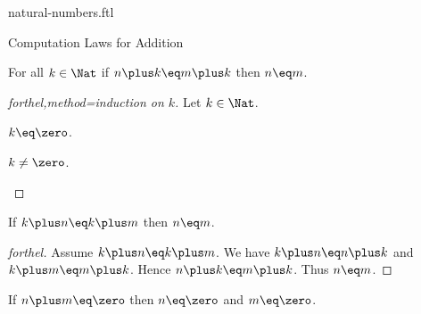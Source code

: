 \documentclass{naproche-library}
\begin{document}
\begin{smodule}[title=Natural Numbers]{natural-numbers.ftl}
\begin{sfragment}{Computation Laws for Addition}
  \begin{proposition}[forthel,title=Right cancellation,id=PlusIsRightCancellativeProp]
    For all $k\in\Nat$ if $n\plus k\eq m\plus k$ then $n\eq m$.
  \end{proposition}
  \begin{proof}[forthel,method=induction on $k$]
    Let $k\in\Nat$.

    \begin{case}{$k\eq\zero$.}\end{case}

    \begin{case}{$k\neq\zero$.}\end{case}
  \end{proof}

  \begin{corollary}[forthel,title=Left cancellation,id=PlusIsLeftCancellativeProp]
    If $k\plus n\eq k\plus m$ then $n\eq m$.
  \end{corollary}
  \begin{proof}[forthel]
    Assume $k\plus n\eq k\plus m$.
    We have $k\plus n\eq n\plus k$ and $k\plus m\eq m\plus k$.
    Hence $n\plus k\eq m\plus k$.
    Thus $n\eq m$.
  \end{proof}

  \begin{proposition}[forthel,id=ZeroSumImpliesZeroSummandsProp]
    If $n\plus m\eq\zero$ then $n\eq\zero$ and $m\eq\zero$.
  \end{proposition}
\end{sfragment}
\end{smodule}
\end{document}
